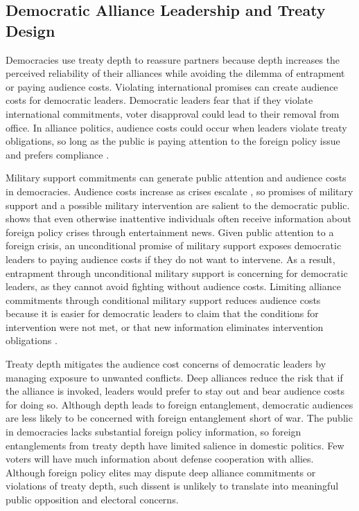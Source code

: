\documentclass[12pt]{article}
\begin{document}
\subsection{Democratic Alliance Leadership and Treaty Design}


Democracies use treaty depth to reassure partners because depth increases the perceived reliability of their alliances while avoiding the dilemma of entrapment or paying audience costs. 
Violating international promises can create audience costs for democratic leaders.
Democratic leaders fear that if they violate international commitments, voter disapproval could lead to their removal from office.  
In alliance politics, audience costs could occur when leaders violate treaty obligations, so long as the public is paying attention to the foreign policy issue \citep{Slantchev2006, PotterBaum2014} and prefers compliance \citep{Chaudoin2014, KertzerBrutger2016}.  


Military support commitments can generate public attention and audience costs in democracies. 
Audience costs increase as crises escalate \citep{Tomz2007}, so promises of military support and a possible military intervention are salient to the democratic public.  
\citet{Baum2002} shows that even otherwise inattentive individuals often receive information about foreign policy crises through entertainment news. 
Given public attention to a foreign crisis, an unconditional promise of military support exposes democratic leaders to paying audience costs if they do not want to intervene. 
As a result, entrapment through unconditional military support is concerning for democratic leaders, as they cannot avoid fighting without audience costs.
Limiting alliance commitments through conditional military support reduces audience costs because it is easier for democratic leaders to claim that the conditions for intervention were not met, or that new information eliminates intervention obligations \citep{LevenduskyHorowitz2012}. 


Treaty depth mitigates the audience cost concerns of democratic leaders by managing exposure to unwanted conflicts.  
Deep alliances reduce the risk that if the alliance is invoked, leaders would prefer to stay out and bear audience costs for doing so. 
Although depth leads to foreign entanglement, democratic audiences are less likely to be concerned with foreign entanglement short of war.
The public in democracies lacks substantial foreign policy information, so foreign entanglements from treaty depth have limited salience in domestic politics. 
Few voters will have much information about defense cooperation with allies. 
Although foreign policy elites may dispute deep alliance commitments or violations of treaty depth, such dissent is unlikely to translate into meaningful public opposition and electoral concerns.
\end{document}
